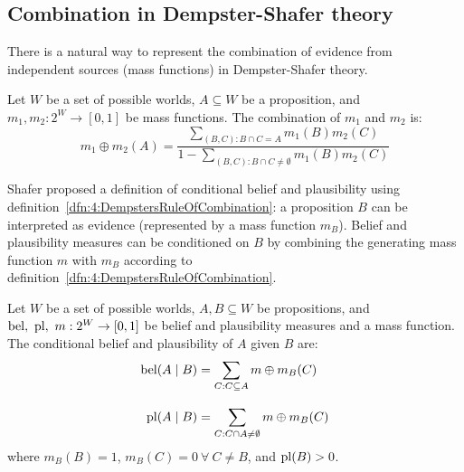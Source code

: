 \subsection{Combination in Dempster-Shafer theory}

There is a natural way to represent the combination of evidence from
independent sources (mass functions) in Dempster-Shafer theory.

\begin{dfn}
  \label{dfn:4:DempstersRuleOfCombination}
  Let $W$ be a set of possible worlds, $A \subseteq W$ be a proposition, and
  $m_1, m_2 : 2^W \to [0, 1]$ be mass functions.
  The combination of $m_1$ and $m_2$ is:
  \begin{equation}
    \label{eqn:4:DempstersRuleOfCombination}
    m_1 \oplus m_2 (A)
    = \frac{
      \sum_{(B, C) : B \cap C = A} m_1(B) m_2(C)
    }{
      1 - \sum_{(B, C) : B \cap C \neq \emptyset} m_1(B) m_2(C)
    }
  \end{equation}
\end{dfn}

Shafer proposed a definition of conditional belief and plausibility using
definition~\ref{dfn:4:DempstersRuleOfCombination}: a proposition $B$ can be
interpreted as evidence (represented by a mass function $m_B$).
Belief and plausibility measures can be conditioned on $B$ by combining the
generating mass function $m$ with $m_B$ according to
definition~\ref{dfn:4:DempstersRuleOfCombination}.

\begin{dfn}
  \label{dfn:4:ConditionalBeliefPlausibility}
  Let $W$ be a set of possible worlds, $A, B \subseteq W$ be propositions, and
  $\operatorname*{bel},\ \operatorname*{pl},\ m : 2^W \to [0, 1]$ be belief and plausibility measures and a
  mass function.
  The conditional belief and plausibility of $A$ given $B$ are:
  \begin{align}
    \label{eqn:4:ConditionalBelief}
    \operatorname*{bel}(A \mid B)
     & = \sum_{C : C \subseteq A} m \oplus m_B(C)
    \\[2ex]
    \label{eqn:4:ConditionalPlausibility}
    \operatorname*{pl}(A \mid B)
     & = \sum_{C : C \cap A \neq \emptyset} m \oplus m_B(C)
  \end{align}
  where $m_B(B) = 1$, $m_B(C) = 0\ \forall\ C \neq B$, and $\operatorname*{pl}(B) > 0$.
\end{dfn}


